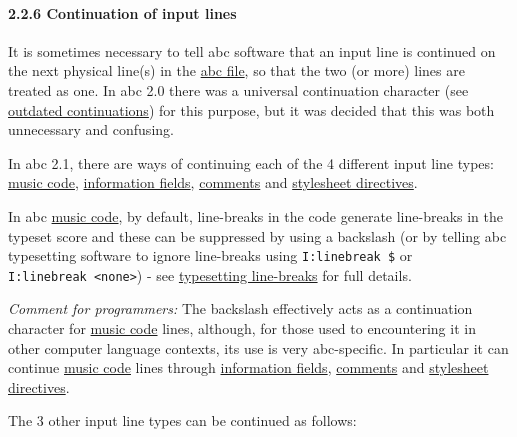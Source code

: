 \documentclass[oneside]{book}
\let\oldparagraph\paragraph
\renewcommand{\paragraph}[1]{\oldparagraph{#1}\mbox{}}
\begin{document}
\hypertarget{continuation_of_input_lines}{\paragraph{2.2.6 Continuation
of input lines}\label{continuation_of_input_lines}}

It is sometimes necessary to tell abc software that an input line is
continued on the next physical line(s) in the
\protect\hyperlink{abc_file_definition}{abc file}, so that the two (or
more) lines are treated as one. In abc 2.0 there was a universal
continuation character (see
\protect\hyperlink{outdated_continuations}{outdated continuations}) for
this purpose, but it was decided that this was both unnecessary and
confusing.

In abc 2.1, there are ways of continuing each of the 4 different input
line types: \protect\hyperlink{music_code_definition}{music code},
\protect\hyperlink{information_field_definition}{information fields},
\protect\hyperlink{comment_definition}{comments} and
\protect\hyperlink{stylesheet_directive_definition}{stylesheet
directives}.

In abc \protect\hyperlink{music_code_definition}{music code}, by
default, line-breaks in the code generate line-breaks in the typeset
score and these can be suppressed by using a backslash (or by telling
abc typesetting software to ignore line-breaks using
\texttt{I:linebreak\ \$} or
\texttt{I:linebreak\ \textless{}none\textgreater{}}) - see
\protect\hyperlink{typesetting_line-breaks}{typesetting line-breaks} for
full details.

\emph{Comment for programmers:} The backslash effectively acts as a
continuation character for
\protect\hyperlink{music_code_definition}{music code} lines, although,
for those used to encountering it in other computer language contexts,
its use is very abc-specific. In particular it can continue
\protect\hyperlink{music_code_definition}{music code} lines through
\protect\hyperlink{information_field_definition}{information fields},
\protect\hyperlink{comment_definition}{comments} and
\protect\hyperlink{stylesheet_directive_definition}{stylesheet
directives}.

The 3 other input line types can be continued as follows:
\end{document}
